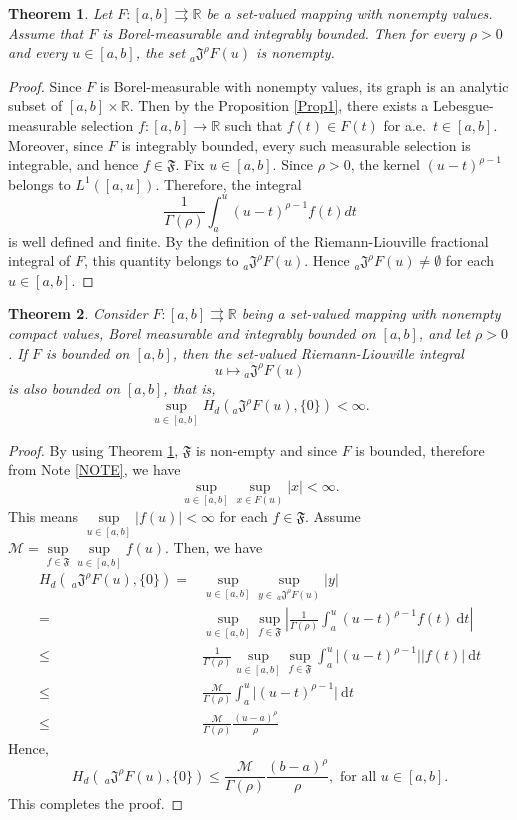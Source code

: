 \documentclass[a4paper,12pt,reqno]{amsart}
\numberwithin{equation}{section}
\newtheorem{theorem}{Theorem}[section]
\theoremstyle{definition}
\theoremstyle{remark}
\numberwithin{equation}{section}
\begin{document}
\begin{theorem}\label{THnonempty}
Let $F:[a,b]\rightrightarrows\mathbb{R}$ be a set-valued mapping with nonempty values. Assume that $F$ is Borel-measurable and integrably
bounded. Then for every $\rho>0$ and every $u\in[a,b]$, the set ${}_{a}\mathfrak{J}^{\rho}F(u)$ is nonempty.
\end{theorem}
\begin{proof}
Since $F$ is Borel-measurable with nonempty values, its graph is an
analytic subset of $[a,b]\times\mathbb{R}$. Then by the Proposition \ref{Prop1}, there exists a Lebesgue-measurable selection
$f:[a,b]\to\mathbb{R}$ such that $f(t)\in F(t)$ for a.e.~$t\in[a,b]$. Moreover, since $F$ is integrably bounded, every such measurable
selection is integrable, and hence $f\in\mathfrak{F}$. Fix $u\in[a,b]$. Since $\rho>0$, the kernel $(u-t)^{\rho-1}$ belongs to
$L^{1}([a,u])$. Therefore, the integral
$$ \frac{1}{\Gamma(\rho)}\int_{a}^{u}(u-t)^{\rho-1}f(t)dt $$ is well defined and finite. By the definition of the Riemann-Liouville fractional integral of $F$, this quantity belongs to
${}_{a}\mathfrak{J}^{\rho}F(u)$. Hence
${}_{a}\mathfrak{J}^{\rho}F(u)\neq\emptyset$ for each $u\in[a,b]$.
\end{proof}
\begin{theorem}
Consider $F:[a,b]\rightrightarrows \mathbb{R}$ being a set-valued mapping with nonempty
compact values, Borel measurable and integrably bounded on $[a,b]$, and
let $\rho>0$. If $F$ is bounded on $[a,b]$, then the set-valued
Riemann-Liouville integral
\[
u \longmapsto {}_{a}\mathfrak{J}^{\rho}F(u)
\]
is also bounded on $[a,b]$, that is,
\[
\sup_{u\in[a,b]} H_d\!\left({}_{a}\mathfrak{J}^{\rho}F(u),\{0\}\right) < \infty.
\]
\end{theorem}
\begin{proof}
By using Theorem \ref{THnonempty}, $\mathfrak{F}$ is non-empty and since $F$ is bounded, therefore from Note \ref{NOTE}, we have 
\[\sup_{u\in [a,b]} \sup_{x\in F(u)} \lvert x \rvert < \infty.\]
This means $\underset{u\in [a,b]}{\sup}\lvert f(u) \rvert < \infty$ for each $f\in \mathfrak{F}$. Assume $\mathcal{M}=\underset{f\in \mathfrak{F}}{\sup}\underset{u\in [a,b]}{\sup}f(u)$. Then, we have
\begin{align*}
  H_d\left(~_{a}\mathfrak{J}^{\rho}F(u), \{0\} \right)=& \sup_{u\in [a,b]} \sup_{y\in~_{a}\mathfrak{J}^{\rho}F(u)} \lvert y \rvert\\
  =& \sup_{u\in [a,b]} \sup_{f\in \mathfrak{F}} \left\lvert \frac{1}{\Gamma(\rho)} \int_{a}^{u}(u-t)^{\rho-1}f(t)~\mathrm{d}t \right\rvert\\
  \leq &\frac{1}{\Gamma(\rho)} \sup_{u\in [a,b]}\sup_{f\in \mathfrak{F}} \int_{a}^{u}\lvert (u-t)^{\rho-1} \rvert \lvert f(t) \rvert ~\mathrm{d}t\\
  \leq & \frac{\mathcal{M}}{\Gamma(\rho)}\int_{a}^{u} \lvert (u-t)^{\rho-1}\rvert ~\mathrm{d}t\\
  \leq & \frac{\mathcal{M}}{\Gamma(\rho)} \frac{(u-a)^{\rho}}{\rho}
\end{align*}
Hence,
\[H_d\left(~_{a}\mathfrak{J}^{\rho}F(u), \{0\}\right) \leq \frac{\mathcal{M}}{\Gamma(\rho)}\frac{(b-a)^{\rho}}{\rho}, \text{ for all } u\in [a,b].\]
This completes the proof.
\end{proof}
\end{document}

